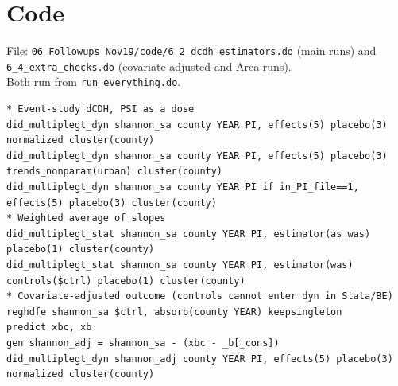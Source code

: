 \documentclass[11pt]{article}
\begin{document}
\section{Code}
File: \texttt{06\_Followups\_Nov19/code/6\_2\_dcdh\_estimators.do} (main runs) and \texttt{6\_4\_extra\_checks.do} (covariate-adjusted and Area runs).\\ Both run from \texttt{run\_everything.do}.
\begin{lstlisting}
* Event-study dCDH, PSI as a dose
did_multiplegt_dyn shannon_sa county YEAR PI, effects(5) placebo(3) normalized cluster(county)
did_multiplegt_dyn shannon_sa county YEAR PI, effects(5) placebo(3) trends_nonparam(urban) cluster(county)
did_multiplegt_dyn shannon_sa county YEAR PI if in_PI_file==1, effects(5) placebo(3) cluster(county)
* Weighted average of slopes
did_multiplegt_stat shannon_sa county YEAR PI, estimator(as was) placebo(1) cluster(county)
did_multiplegt_stat shannon_sa county YEAR PI, estimator(was) controls($ctrl) placebo(1) cluster(county)
* Covariate-adjusted outcome (controls cannot enter dyn in Stata/BE)
reghdfe shannon_sa $ctrl, absorb(county YEAR) keepsingleton
predict xbc, xb
gen shannon_adj = shannon_sa - (xbc - _b[_cons])
did_multiplegt_dyn shannon_adj county YEAR PI, effects(5) placebo(3) normalized cluster(county)
\end{lstlisting}
\end{document}
